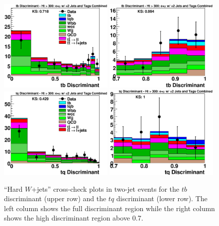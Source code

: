 \clearpage
\begin{figure}[!h!tbp]
\includegraphics[width=0.49\textwidth]
{eps/MatrixElement/cross_check/combined/2jet/TTbar_tb_Discriminant}
\includegraphics[width=0.49\textwidth]
{eps/MatrixElement/cross_check/combined/2jet/TTbar_tb_Discriminant_Zoom}
\includegraphics[width=0.49\textwidth]
{eps/MatrixElement/cross_check/combined/2jet/TTbar_tq_Discriminant}
\includegraphics[width=0.49\textwidth]
{eps/MatrixElement/cross_check/combined/2jet/TTbar_tq_Discriminant_Zoom}
\vspace{-0.1in}
\caption{``Hard $W$+jets'' cross-check plots in two-jet
events for the $tb$ discriminant (upper row) and the $tq$ discriminant
(lower row). The left column shows the full discriminant region while
the right column shows the high discriminant region above 0.7.}
\label{ttbar-cross-2jet}
\end{figure}

